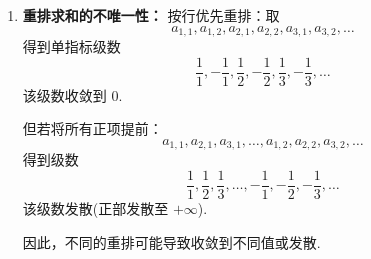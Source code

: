\begin{solution}
\begin{enumerate}[leftmargin=*,label=\arabic*.]
\begin{enumerate}
        可见两个累次求和一个发散，一个收敛到 $0$，不相等.
        
        \item[iv.] \textbf{重排求和的不唯一性：}
        按行优先重排：取
        \[
        a_{1,1}, a_{1,2}, a_{2,1}, a_{2,2}, a_{3,1}, a_{3,2}, \dots
        \]
        得到单指标级数
        \[
        \frac{1}{1}, -\frac{1}{1}, \frac{1}{2}, -\frac{1}{2}, \frac{1}{3}, -\frac{1}{3}, \dots
        \]
        该级数收敛到 $0$.
        
        但若将所有正项提前：
        \[
        a_{1,1}, a_{2,1}, a_{3,1}, \dots, a_{1,2}, a_{2,2}, a_{3,2}, \dots
        \]
        得到级数
        \[
        \frac{1}{1}, \frac{1}{2}, \frac{1}{3}, \dots, -\frac{1}{1}, -\frac{1}{2}, -\frac{1}{3}, \dots
        \]
        该级数发散(正部发散至 $+\infty$).
        
        因此，不同的重排可能导致收敛到不同值或发散.
    \end{enumerate}
    \end{enumerate}
\end{solution}